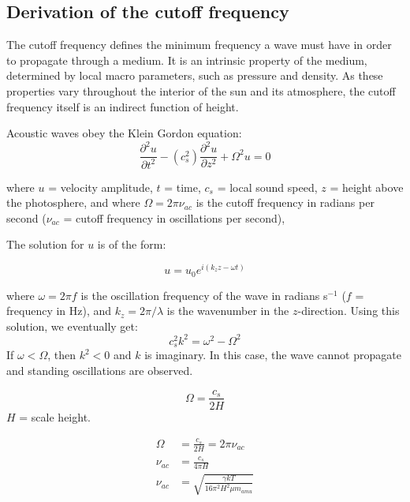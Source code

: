 \clearpage
\subsection{Derivation of the cutoff frequency}

The cutoff frequency defines the minimum frequency a wave must have in order to
propagate through a medium.
It is an intrinsic property of the medium,
determined by local macro parameters, such as pressure and density.
As these properties vary throughout the interior of the sun and its atmosphere,
the cutoff frequency itself is an indirect function of height.


Acoustic waves obey the Klein Gordon equation:
\begin{equation}
    \frac{\partial^{2}u}{\partial t^{2}}
    - \left( c_{s}^{2} \right)
    \frac{\partial^{2}u}{\partial z^{2}}
    + \Omega^{2}u
    = 0
\end{equation}

where
$u$ = velocity amplitude,
$t$ = time,
$c_{s}$ = local sound speed,
$z$ = height above the photosphere, and
where $\Omega = 2\pi\nu_{ac}$
is the cutoff frequency in radians per second
($\nu_{ac}$ = cutoff frequency in oscillations per second),


The solution for $u$ is of the form:

\begin{equation}
    u = u_{0}e^{i\left( k_{z}z - \omega t \right)}
\end{equation}

where $\omega = 2 \pi f$ is the oscillation frequency of the wave
in radians s$^{-1}$ ($f$ = frequency in Hz), and $k_{z} = 2\pi/\lambda$
is the wavenumber in the $z$-direction.
Using this solution, we eventually get:
\begin{equation}
    c_{s}^{2} k^{2} = \omega^{2} - \Omega^{2}
\end{equation}
If $\omega < \Omega$, then $k^{2} < 0$ and $k$ is imaginary.
In this case, the wave cannot propagate and standing oscillations are
observed.

\begin{equation}
    \Omega = \frac{c_{s}}{2H}
\end{equation}
$H$ = scale height.

\begin{align}
    \Omega &= \frac{c_{s}}{2H} = 2\pi\nu_{ac}\\
    \nu_{ac} &= \frac{c_{s}}{4 \pi H}\\
    \nu_{ac} &= \sqrt{ \frac{\gamma k T }{ 16 \pi^{2} H^{2} \mu m_{amu} } }
\end{align}


